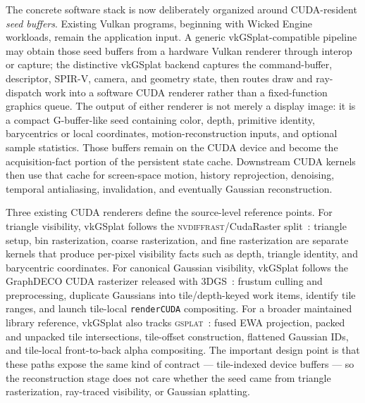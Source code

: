 \documentclass[10pt,journal,onecolumn]{IEEEtran}
\begin{document}
The concrete software stack is now deliberately organized around
CUDA-resident \emph{seed buffers}.  Existing Vulkan programs, beginning
with Wicked Engine workloads, remain the application input.  A generic
vkGSplat-compatible pipeline may obtain those seed buffers from a hardware Vulkan
renderer through interop or capture; the distinctive vkGSplat backend captures
the command-buffer, descriptor, SPIR-V, camera, and geometry state, then routes
draw and ray-dispatch work into a software CUDA renderer rather than a
fixed-function graphics queue.  The output of either renderer is not merely a
display image: it is a compact G-buffer-like seed containing color, depth,
primitive identity,
barycentrics or local coordinates, motion-reconstruction inputs, and
optional sample statistics.  Those buffers remain on the CUDA device and
become the acquisition-fact portion of the persistent state cache. Downstream
CUDA kernels then use that cache for screen-space motion, history reprojection,
denoising, temporal antialiasing, invalidation, and eventually Gaussian
reconstruction.

Three existing CUDA renderers define the source-level reference points.
For triangle visibility, vkGSplat follows the
\textsc{nvdiffrast}/CudaRaster split~\cite{laine2020nvdiffrast}: triangle
setup, bin rasterization, coarse rasterization, and fine rasterization
are separate kernels that produce per-pixel visibility facts such as
depth, triangle identity, and barycentric coordinates.  For canonical
Gaussian visibility, vkGSplat follows the GraphDECO CUDA rasterizer
released with 3DGS~\cite{kerbl20233dgs}: frustum culling and
preprocessing, duplicate Gaussians into tile/depth-keyed work items,
identify tile ranges, and launch tile-local \texttt{renderCUDA}
compositing.  For a broader maintained library reference, vkGSplat also
tracks \textsc{gsplat}~\cite{ye2024gsplat}: fused EWA projection, packed
and unpacked tile intersections, tile-offset construction, flattened
Gaussian IDs, and tile-local front-to-back alpha compositing.  The
important design point is that these paths expose the same kind of
contract --- tile-indexed device buffers --- so the reconstruction stage
does not care whether the seed came from triangle rasterization,
ray-traced visibility, or Gaussian splatting.
\end{document}
